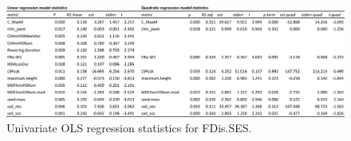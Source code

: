 \begin{landscape}
\begin{figure}[h!]
\begin{center}
\includegraphics[width=20cm]{S2c.pdf} %
\caption[Univariate OLS regression statistics for FDis.SES.]{\small{Univariate OLS regression statistics for FDis.SES.}} %
\label{fig:Ch4sup2_F1} %
\end{center}
\end{figure}   
\end{landscape}
\clearpage


